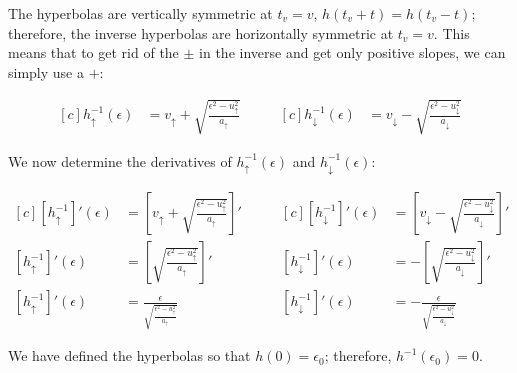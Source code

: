 The hyperbolas are vertically symmetric at $t_v=v$, $h(t_v+t) = h(t_v-t)$; therefore, the inverse hyperbolas are horizontally symmetric at $t_v = v$. This means that to get rid of the $\pm$ in the inverse and get only positive slopes, we can simply use a $+$:

\begin{equation*}
	\begin{aligned}[c]
		h_{\uparrow}^{-1}(\epsilon) &= v_{\uparrow} + \sqrt{\frac{\epsilon^2 - u_{\uparrow}^2}{a_{\uparrow}}}
	\end{aligned}
	\qquad
	\begin{aligned}[c]
	h_{\downarrow}^{-1}(\epsilon) &= v_{\downarrow} - \sqrt{\frac{\epsilon^2 - u_{\downarrow}^2}{a_{\downarrow}}}
	\end{aligned}
\end{equation*}
	
We now determine the derivatives of $h_{\uparrow}^{-1}(\epsilon)$ and $h_{\downarrow}^{-1}(\epsilon)$:

\begin{equation*}
	\begin{aligned}[c]
		[h_{\uparrow}^{-1}]'(\epsilon) &= \left[ v_{\uparrow} + \sqrt{\frac{\epsilon^2 - u_{\uparrow}^2}{a_{\uparrow}}} \right]'\\
		[h_{\uparrow}^{-1}]'(\epsilon) &= \left[\sqrt{\frac{\epsilon^2 - u_{\uparrow}^2}{a_{\uparrow}}} \right]'\\
		[h_{\uparrow}^{-1}]'(\epsilon) &= \frac{ \epsilon }{ \sqrt{\frac{\epsilon^2 - u_{\uparrow}^2}{a_{\uparrow}}} }
	\end{aligned}
	\qquad
	\begin{aligned}[c]
		[h_{\downarrow}^{-1}]'(\epsilon) &= \left[ v_{\downarrow} - \sqrt{\frac{\epsilon^2 - u_{\downarrow}^2}{a_{\downarrow}}} \right]'\\
		[h_{\downarrow}^{-1}]'(\epsilon) &= - \left[\sqrt{\frac{\epsilon^2 - u_{\downarrow}^2}{a_{\downarrow}}} \right]'\\
		[h_{\downarrow}^{-1}]'(\epsilon) &= - \frac{ \epsilon }{ \sqrt{\frac{\epsilon^2 - u_{\downarrow}^2}{a_{\downarrow}}} }
	\end{aligned}
\end{equation*}

We have defined the hyperbolas so that $h(0) = \epsilon_0$; therefore, $h^{-1}(\epsilon_0) = 0$.

